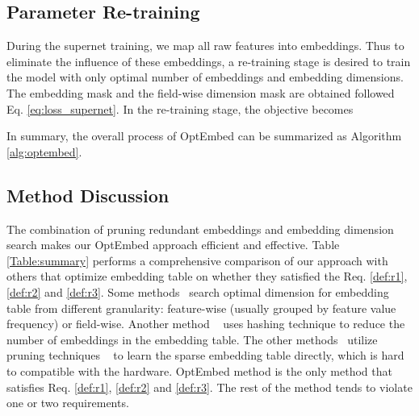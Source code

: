 \documentclass[sigconf]{acmart}
\begin{document}
\subsection{Parameter Re-training}
\label{sec:retrain}

During the supernet training, we map all raw features into embeddings. Thus to eliminate the influence of these embeddings, a re-training stage is desired to train the model with only optimal number of embeddings and embedding dimensions. The embedding mask  and the field-wise dimension mask  are obtained followed Eq. \ref{eq:loss_supernet}. In the re-training stage, the objective becomes

In summary, the overall process of OptEmbed can be summarized as Algorithm \ref{alg:optembed}.



\subsection{Method Discussion}
\label{sec:summary}

The combination of pruning redundant embeddings and embedding dimension search makes our OptEmbed approach efficient and effective. Table \ref{Table:summary} performs a comprehensive comparison of our approach with others that optimize embedding table on whether they satisfied the Req. \ref{def:r1}, \ref{def:r2} and \ref{def:r3}. Some methods~\cite{MDE,DNIS,AutoDim,AutoIAS,MGQE} search optimal dimension for embedding table from different granularity: feature-wise (usually grouped by feature value frequency) or field-wise. Another method ~\cite{QR} uses hashing technique to reduce the number of embeddings in the embedding table. The other methods~\cite{UMEC,PEP} utilize pruning techniques ~\cite{DST,LTH} to learn the sparse embedding table directly, which is hard to compatible with the hardware. OptEmbed method is the only method that satisfies Req. \ref{def:r1}, \ref{def:r2} and \ref{def:r3}. The rest of the method tends to violate one or two requirements. 
\end{document}
